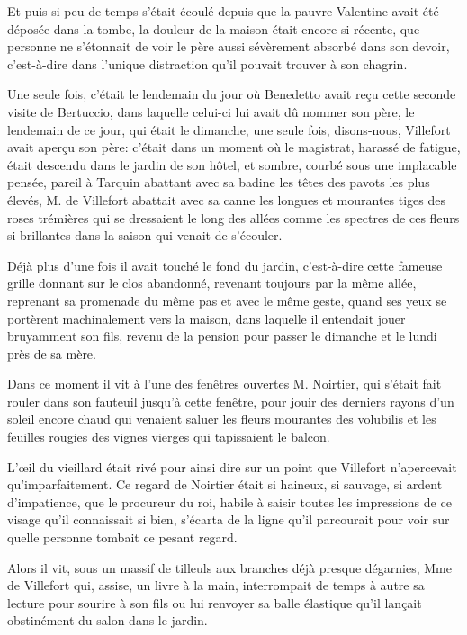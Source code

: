 Et puis si peu de temps s'était écoulé depuis que la pauvre Valentine avait été déposée dans la tombe, la douleur de la maison était encore si récente, que personne ne s'étonnait de voir le père aussi sévèrement absorbé dans son devoir, c'est-à-dire dans l'unique distraction qu'il pouvait trouver à son chagrin. 

Une seule fois, c'était le lendemain du jour où Benedetto avait reçu cette seconde visite de Bertuccio, dans laquelle celui-ci lui avait dû nommer son père, le lendemain de ce jour, qui était le dimanche, une seule fois, disons-nous, Villefort avait aperçu son père: c'était dans un moment où le magistrat, harassé de fatigue, était descendu dans le jardin de son hôtel, et sombre, courbé sous une implacable pensée, pareil à Tarquin abattant avec sa badine les têtes des pavots les plus élevés, M. de Villefort abattait avec sa canne les longues et mourantes tiges des roses trémières qui se dressaient le long des allées comme les spectres de ces fleurs si brillantes dans la saison qui venait de s'écouler. 

Déjà plus d'une fois il avait touché le fond du jardin, c'est-à-dire cette fameuse grille donnant sur le clos abandonné, revenant toujours par la même allée, reprenant sa promenade du même pas et avec le même geste, quand ses yeux se portèrent machinalement vers la maison, dans laquelle il entendait jouer bruyamment son fils, revenu de la pension pour passer le dimanche et le lundi près de sa mère. 

Dans ce moment il vit à l'une des fenêtres ouvertes M. Noirtier, qui s'était fait rouler dans son fauteuil jusqu'à cette fenêtre, pour jouir des derniers rayons d'un soleil encore chaud qui venaient saluer les fleurs mourantes des volubilis et les feuilles rougies des vignes vierges qui tapissaient le balcon. 

L'œil du vieillard était rivé pour ainsi dire sur un point que Villefort n'apercevait qu'imparfaitement. Ce regard de Noirtier était si haineux, si sauvage, si ardent d'impatience, que le procureur du roi, habile à saisir toutes les impressions de ce visage qu'il connaissait si bien, s'écarta de la ligne qu'il parcourait pour voir sur quelle personne tombait ce pesant regard. 

Alors il vit, sous un massif de tilleuls aux branches déjà presque dégarnies, Mme de Villefort qui, assise, un livre à la main, interrompait de temps à autre sa lecture pour sourire à son fils ou lui renvoyer sa balle élastique qu'il lançait obstinément du salon dans le jardin. 


